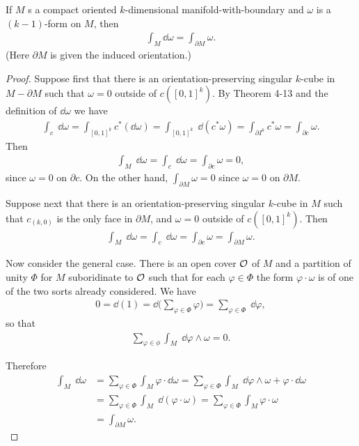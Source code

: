 \begin{theorem}
  If $M$ s a compact oriented $k$-dimensional manifold-with-boundary and $\omega$ is a
  $(k-1)$-form on $M$, then
  \begin{align*}
    \int_M\dd\omega = \int_{\partial M}\omega.
  \end{align*}
  \textup{(Here $\partial M$ is given the induced orientation.)}
\end{theorem}


\begin{proof}
    Suppose first that there is an orientation-preserving singular $k$-cube in $M-\partial M$ such that 
    $\omega=0$ outside of $c([0,1]^k)$. By Theorem 4-13 and the definition of $\dd\omega$ we have 
    \begin{align*}
        \int_{c}\;\dd\omega
        = \int_{[0,1]^k}c^*(\dd\omega)
        = \int_{[0,1]^k}\;\dd(c^*\omega)
        = \int_{\partial I^k}c^*\omega
        = \int_{\partial c}\omega.    
    \end{align*} 
    Then 
    \begin{align*}
        \int_M\;\dd\omega
        = \int_c\;\dd\omega
        = \int_{\partial c}\omega
        = 0 , 
    \end{align*}
    since $\omega=0$ on $\partial c$. On the other hand, $\int_{\partial M}\omega =0$ since 
    $\omega=0$ on $\partial M$.

    Suppose next that there is an orientation-preserving singular $k$-cube in $M$ such that 
    $c_{(k,0)}$ is the only face in $\partial M$, and $\omega=0$ outside of $c([0,1]^k)$. Then
    \begin{align*}
        \int_{{M}}\;\dd\omega
        = \int_{{c}}\;\dd\omega
        = \int_{{\partial c}}\omega
        = \int_{{\partial M}}\omega .      
    \end{align*}

    Now consider the general case. There is an open cover $\mathcal{O}$ of $M$ and a partition of unity
    $\Phi$ for $M$ suboridinate to $\mathcal{O}$ such that for each $\varphi\in\Phi$ the form $\varphi\cdot\omega$
    is of one of the two sorts already considered. We have 
    \begin{align*}
        0 = \dd(1) = \dd\bigg(\sum_{\varphi\in\Phi}\varphi\bigg)
        = \sum_{\varphi\in\Phi}\;\dd\varphi,
    \end{align*}
    so that 
    \begin{align*}
      \sum_{\varphi\in\phi}^{}{\int_M \;\dd\varphi\wedge\omega} = 0.
    \end{align*}

    Therefore 
    \begin{align*}
        \int_M\;\dd\omega
        & = \sum_{\varphi\in\Phi}\int_M\varphi\cdot \dd\omega
            = \sum_{\varphi\in\Phi}\int_M\;\dd\varphi\wedge\omega+\varphi\cdot \dd\omega \\
        & = \sum_{\varphi\in\Phi}\int_M\;\dd(\varphi\cdot\omega)
            = \sum_{\varphi\in\Phi}\int_M\varphi\cdot\omega  \\
        & = \int_{\partial M}\omega.
    \end{align*}
\end{proof}

